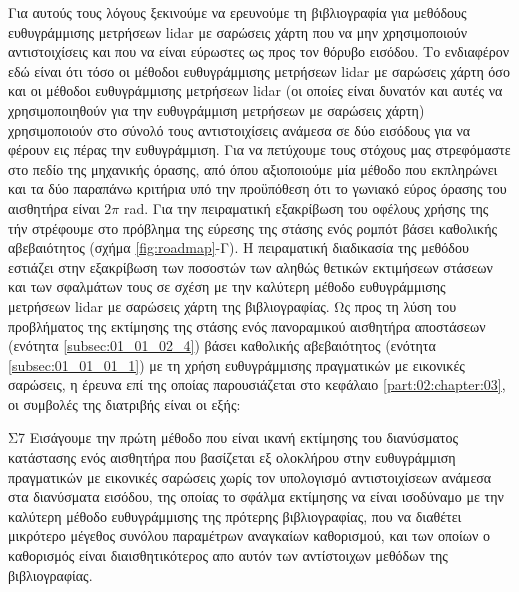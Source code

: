 Για αυτούς τους λόγους ξεκινούμε να ερευνούμε τη βιβλιογραφία για μεθόδους
ευθυγράμμισης μετρήσεων lidar με σαρώσεις χάρτη που να μην χρησιμοποιούν
αντιστοιχίσεις και που να είναι εύρωστες ως προς τον θόρυβο εισόδου. Το
ενδιαφέρον εδώ είναι ότι τόσο οι μέθοδοι ευθυγράμμισης μετρήσεων lidar με
σαρώσεις χάρτη όσο και οι μέθοδοι ευθυγράμμισης μετρήσεων lidar (οι οποίες
είναι δυνατόν και αυτές να χρησιμοποιηθούν για την ευθυγράμμιση μετρήσεων με
σαρώσεις χάρτη) χρησιμοποιούν στο σύνολό τους αντιστοιχίσεις ανάμεσα σε δύο
εισόδους για να φέρουν εις πέρας την ευθυγράμμιση. Για να πετύχουμε τους
στόχους μας στρεφόμαστε στο πεδίο της μηχανικής όρασης, από όπου αξιοποιούμε
μία μέθοδο που εκπληρώνει και τα δύο παραπάνω κριτήρια υπό την προϋπόθεση ότι
το γωνιακό εύρος όρασης του αισθητήρα είναι $2\pi$ rad. Για την πειραματική
εξακρίβωση του οφέλους χρήσης της τήν στρέφουμε στο πρόβλημα της εύρεσης της
στάσης ενός ρομπότ βάσει καθολικής αβεβαιότητος (σχήμα \ref{fig:roadmap}-Γ). Η
πειραματική διαδικασία της μεθόδου εστιάζει στην εξακρίβωση των ποσοστών των
αληθώς θετικών εκτιμήσεων στάσεων και των σφαλμάτων τους σε σχέση με την
καλύτερη μέθοδο ευθυγράμμισης μετρήσεων lidar με σαρώσεις χάρτη της
βιβλιογραφίας. Ως προς τη λύση του προβλήματος της εκτίμησης της στάσης ενός
πανοραμικού αισθητήρα αποστάσεων (ενότητα \ref{subsec:01_01_02_4}) βάσει
καθολικής αβεβαιότητος (ενότητα \ref{subsec:01_01_01_1}) με τη χρήση
ευθυγράμμισης πραγματικών με εικονικές σαρώσεις, η έρευνα επί της οποίας
παρουσιάζεται στο κεφάλαιο \ref{part:02:chapter:03}, οι συμβολές της διατριβής
είναι οι εξής:

\begin{bw_box}
\begin{customcontribution}{Σ7}
  \label{contribution:07}
  Εισάγουμε την πρώτη μέθοδο που είναι ικανή εκτίμησης του διανύσματος
  κατάστασης ενός αισθητήρα που βασίζεται εξ ολοκλήρου στην ευθυγράμμιση
  πραγματικών με εικονικές σαρώσεις χωρίς τον υπολογισμό αντιστοιχίσεων ανάμεσα
  στα διανύσματα εισόδου, της οποίας το σφάλμα εκτίμησης να είναι ισοδύναμο με
  την καλύτερη μέθοδο ευθυγράμμισης της πρότερης βιβλιογραφίας, που να διαθέτει
  μικρότερο μέγεθος συνόλου παραμέτρων αναγκαίων καθορισμού, και των οποίων ο
  καθορισμός είναι διαισθητικότερος απο αυτόν των αντίστοιχων μεθόδων της
  βιβλιογραφίας.  \cite{Filotheou2022e}
\end{customcontribution}
\end{bw_box}

